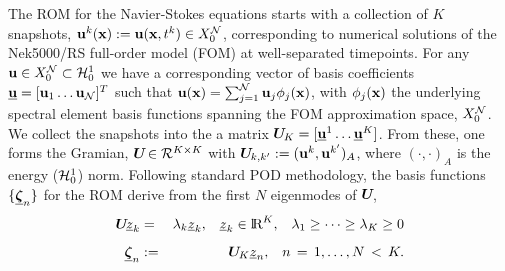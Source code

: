 The ROM for the Navier-Stokes equations starts with a collection of $K$
snapshots, $\mathbf{u}^k(\mathbf{x}) := \mathbf{u}(\mathbf{x},t^k) \in X_0^{{\cal N}}$, corresponding to
numerical solutions of the Nek5000/RS full-order model (FOM) at well-separated
timepoints.  For any $\mathbf{u} \in X_0^{{\cal N}} \subset {\cal H}^1_0$ we have a
corresponding vector of basis coefficients $\mathbf{\underline u}=[\mathbf{u}_1\dots \mathbf{u}_{{\cal N}}]^T$ such
that $\mathbf{u}(\mathbf{x})=\sum_{j=1}^{\cal N} \mathbf{u}_j \phi_j(\mathbf{x})$, with $\phi_j(\mathbf{x})$ the
underlying spectral element basis functions spanning the FOM approximation
space, $X_0^{\cal N}$.  We collect the snapshots into the a matrix ${\mbox{\boldmath $ U $}}\!_K = [ \mathbf{\underline u}^1
\dots \mathbf{\underline u}^K ]$.  From these, one forms the Gramian, ${\mbox{\boldmath $ U $}}\! \in {\cal R}^{K \times K}$
with ${\mbox{\boldmath $ U $}}\!_{k,k'} := (\mathbf{u}^k,\mathbf{u}^{k'})_A$, where $(\cdot,\cdot)_A$ is the energy
(${\cal H}_0^1$) norm.  Following standard POD methodology, the basis functions $\{
\mbox{\boldmath $ \underline \zeta $}_n \}$ for the ROM derive from the first $N$ eigenmodes of ${\mbox{\boldmath $ U $}}\!$,
\\[-3.3ex]
\begin{eqnarray} \label{eq:eig}
\bU\uz_k&=&\lambda_k \uz_k,\;\;\;\uz_k \in \RR^K, \;\;\; \lambda_1 
        \ge \cdots \ge \lambda_K \ge 0
                    \\[1.2ex] \label{eq:podbasis}
\uzeta_n &:=& \bU_K \uz_n, \;\;\; n\,=\,1,\dots,N \, < \, K.
\end{eqnarray}

